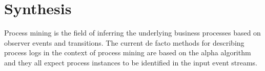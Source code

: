 \documentclass[a4paper,10pt]{article}
\begin{document}
\section{Synthesis}

Process mining is the field of inferring the underlying business processes based on observer events and transitions.
The current de facto methods for describing process logs in the context of process mining are based on the alpha algorithm and they all expect process instances
to be identified in the input event streams.
\end{document}
